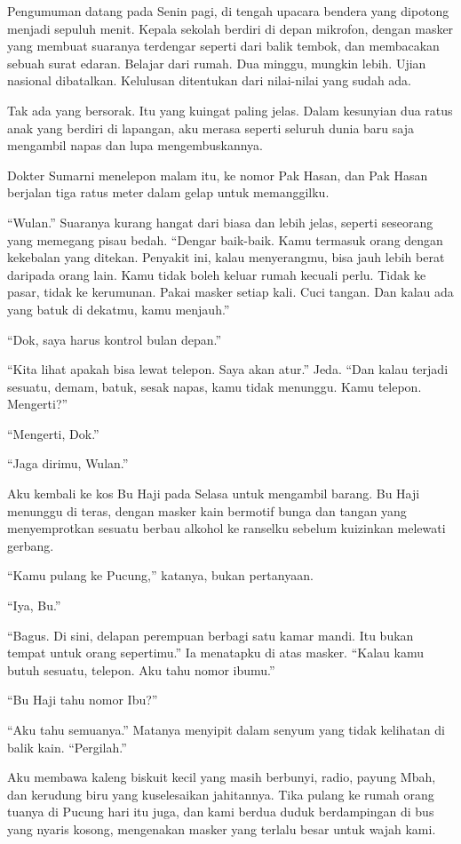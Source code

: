 \documentclass[11pt,twoside,openany]{book}
\begin{document}
Pengumuman datang pada Senin pagi, di tengah upacara bendera yang dipotong menjadi sepuluh menit. Kepala sekolah berdiri di depan mikrofon, dengan masker yang membuat suaranya terdengar seperti dari balik tembok, dan membacakan sebuah surat edaran. Belajar dari rumah. Dua minggu, mungkin lebih. Ujian nasional dibatalkan. Kelulusan ditentukan dari nilai-nilai yang sudah ada.

Tak ada yang bersorak. Itu yang kuingat paling jelas. Dalam kesunyian dua ratus anak yang berdiri di lapangan, aku merasa seperti seluruh dunia baru saja mengambil napas dan lupa mengembuskannya.

Dokter Sumarni menelepon malam itu, ke nomor Pak Hasan, dan Pak Hasan berjalan tiga ratus meter dalam gelap untuk memanggilku.

``Wulan.'' Suaranya kurang hangat dari biasa dan lebih jelas, seperti seseorang yang memegang pisau bedah. ``Dengar baik-baik. Kamu termasuk orang dengan kekebalan yang ditekan. Penyakit ini, kalau menyerangmu, bisa jauh lebih berat daripada orang lain. Kamu tidak boleh keluar rumah kecuali perlu. Tidak ke pasar, tidak ke kerumunan. Pakai masker setiap kali. Cuci tangan. Dan kalau ada yang batuk di dekatmu, kamu menjauh.''

``Dok, saya harus kontrol bulan depan.''

``Kita lihat apakah bisa lewat telepon. Saya akan atur.'' Jeda. ``Dan kalau terjadi sesuatu, demam, batuk, sesak napas, kamu tidak menunggu. Kamu telepon. Mengerti?''

``Mengerti, Dok.''

``Jaga dirimu, Wulan.''

Aku kembali ke kos Bu Haji pada Selasa untuk mengambil barang. Bu Haji menunggu di teras, dengan masker kain bermotif bunga dan tangan yang menyemprotkan sesuatu berbau alkohol ke ranselku sebelum kuizinkan melewati gerbang.

``Kamu pulang ke Pucung,'' katanya, bukan pertanyaan.

``Iya, Bu.''

``Bagus. Di sini, delapan perempuan berbagi satu kamar mandi. Itu bukan tempat untuk orang sepertimu.'' Ia menatapku di atas masker. ``Kalau kamu butuh sesuatu, telepon. Aku tahu nomor ibumu.''

``Bu Haji tahu nomor Ibu?''

``Aku tahu semuanya.'' Matanya menyipit dalam senyum yang tidak kelihatan di balik kain. ``Pergilah.''

Aku membawa kaleng biskuit kecil yang masih berbunyi, radio, payung Mbah, dan kerudung biru yang kuselesaikan jahitannya. Tika pulang ke rumah orang tuanya di Pucung hari itu juga, dan kami berdua duduk berdampingan di bus yang nyaris kosong, mengenakan masker yang terlalu besar untuk wajah kami.
\end{document}
